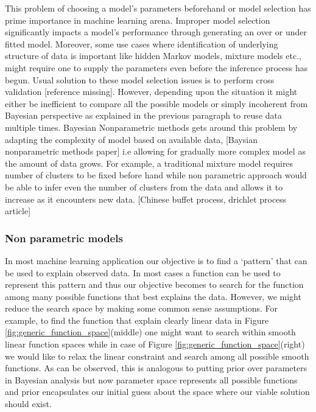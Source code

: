 This problem of choosing a model’s parameters beforehand or model selection has prime importance in machine learning arena. Improper model selection significantly impacts a model’s performance through generating an over or under fitted model. Moreover, some use cases where identification of underlying structure of data is important like hidden Markov models, mixture models etc., might require one to supply the parameters even before the inference process has begun. Usual solution to these model selection issues is to perform cross validation [reference missing]. However, depending upon the situation it might either be inefficient to compare all the possible models or simply incoherent from Bayesian perspective as explained in the previous paragraph to reuse data multiple times. Bayesian Nonparametric methods gets around this problem by adapting the complexity of model based on available data, [Baysian nonparametric methods paper] i.e allowing for gradually more complex model as the amount of data grows. For example, a traditional mixture model requires number of clusters to be fixed before hand while non parametric approach would be able to infer even the number of clusters from the data and allows it to increase as it encounters new data. [Chinese buffet process, drichlet process article]

\subsubsection{Non parametric models}

In most machine learning application our objective is to find a ‘pattern’ that can be used to explain observed data. In most cases a function can be used to represent this pattern and thus our objective becomes to search for the function among many possible functions that best explains the data. However, we might reduce the search space by making some common sense assumptions. For example, to find the function that explain clearly linear data in Figure \ref{fig:generic_function_space}(middle) one might want to search within smooth linear function spaces while in case of Figure \ref{fig:generic_function_space}(right) we would like to relax the linear constraint and search among all possible smooth functions.  As can be observed, this is analogous to putting prior over parameters in Bayesian analysis but now parameter space represents all possible functions and prior encapsulates our initial guess about the space where our viable solution should exist. 

